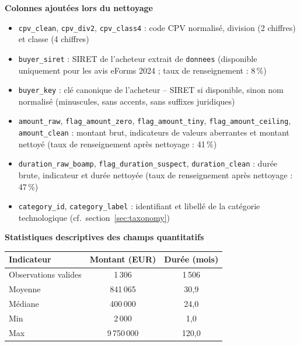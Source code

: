 \documentclass[12pt,a4paper]{article}
\begin{document}
\medskip
\textbf{Colonnes ajoutées lors du nettoyage}

\begin{itemize}
  \item[---] \texttt{cpv\_clean}, \texttt{cpv\_div2}, \texttt{cpv\_class4} :
    code CPV normalisé, division (2 chiffres) et classe (4 chiffres)
  \item[---] \texttt{buyer\_siret} : SIRET de l'acheteur extrait de
    \texttt{donnees} (disponible uniquement pour les avis eForms 2024 ; taux
    de renseignement : 8\,\%)
  \item[---] \texttt{buyer\_key} : clé canonique de l'acheteur -- SIRET si
    disponible, sinon nom normalisé (minuscules, sans accents, sans suffixes
    juridiques)
  \item[---] \texttt{amount\_raw}, \texttt{flag\_amount\_zero},
    \texttt{flag\_amount\_tiny}, \texttt{flag\_amount\_ceiling},
    \texttt{amount\_clean} : montant brut, indicateurs de valeurs aberrantes
    et montant nettoyé (taux de renseignement après nettoyage : 41\,\%)
  \item[---] \texttt{duration\_raw\_boamp}, \texttt{flag\_duration\_suspect},
    \texttt{duration\_clean} : durée brute, indicateur et durée nettoyée
    (taux de renseignement après nettoyage : 47\,\%)
  \item[---] \texttt{category\_id}, \texttt{category\_label} : identifiant et
    libellé de la catégorie technologique (cf.\ section~\ref{sec:taxonomy})
\end{itemize}

\medskip
\textbf{Statistiques descriptives des champs quantitatifs}

\begin{center}
\begin{tabular}{lcc}
\toprule
\textbf{Indicateur} & \textbf{Montant (EUR)} &
  \textbf{Durée (mois)} \\
\midrule
Observations valides & 1\,306 & 1\,506 \\
Moyenne              & 841\,065 & 30,9 \\
Médiane              & 400\,000 & 24,0 \\
Min                  & 2\,000   & 1,0 \\
Max                  & 9\,750\,000 & 120,0 \\
\bottomrule
\end{tabular}
\end{center}

\end{document}
